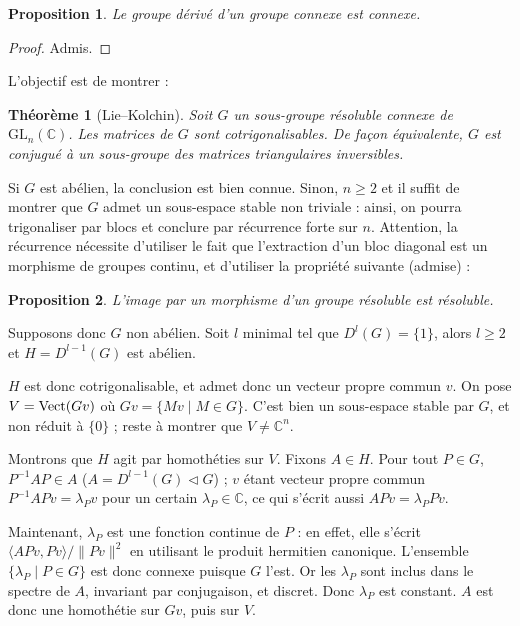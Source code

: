 \documentclass[a4paper, 11pt]{article}
\def\C{\mathbb{C}}
\def\Vect{\textnormal{Vect}}
\def\GL{\mathrm{GL}}
\newtheorem*{proposition}{Proposition}
\newtheorem*{theorem}{Théorème}
\begin{document}
\begin{proposition}
  Le groupe dérivé d'un groupe connexe est connexe.
\end{proposition}
\begin{proof}
  Admis.
\end{proof}

L'objectif est de montrer :

\begin{theorem}[Lie--Kolchin]
  Soit $G$ un sous-groupe résoluble connexe de $\GL_n(\C)$. Les matrices de $G$
  sont cotrigonalisables. De façon équivalente, $G$ est conjugué à un
  sous-groupe des matrices triangulaires inversibles.
\end{theorem}

Si $G$ est abélien, la conclusion est bien connue. Sinon, $n \geq 2$ et il
suffit de montrer que $G$ admet un sous-espace stable non triviale : ainsi, on
pourra trigonaliser par blocs et conclure par récurrence forte sur $n$.
Attention, la récurrence nécessite d'utiliser le fait que l'extraction d'un bloc
diagonal est un morphisme de groupes continu, et d'utiliser la propriété
suivante (admise) :
\begin{proposition}
  L'image par un morphisme d'un groupe résoluble est résoluble.
\end{proposition}

Supposons donc $G$ non abélien. Soit $l$ minimal tel que $D^l(G) = \{1\}$, alors
$l \geq 2$ et $H = D^{l-1}(G)$ est abélien.

$H$ est donc cotrigonalisable, et admet donc un vecteur propre commun $v$. On
pose $V = \Vect(Gv)$ où $Gv = \{Mv \mid M \in G\}$. C'est bien un sous-espace
stable par $G$, et non réduit à $\{0\}$ ; reste à montrer que $V \neq \C^n$.

Montrons que $H$ agit par homothéties sur $V$. Fixons $A \in H$. Pour tout $P
\in G$, $P^{-1}AP \in A$ ($A = D^{l-1}(G) \triangleleft G$) ; $v$ étant vecteur
propre commun $P^{-1}APv = \lambda_P v$ pour un certain $\lambda_P \in \C$, ce
qui s'écrit aussi $APv = \lambda_P Pv$.

Maintenant, $\lambda_P$ est une fonction continue de $P$ : en effet, elle
s'écrit $\langle APv, Pv \rangle / \|Pv\|^2$ en utilisant le produit hermitien
canonique. L'ensemble $\{ \lambda_P \mid P \in G \}$ est donc connexe puisque
$G$ l'est. Or les $\lambda_P$ sont inclus dans le spectre de $A$, invariant par
conjugaison, et discret. Donc $\lambda_P$ est constant. $A$ est donc une
homothétie sur $Gv$, puis sur $V$.
\end{document}
